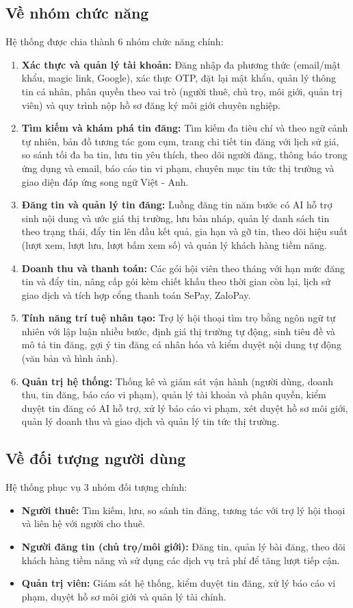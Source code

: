 \subsection{Về nhóm chức năng}
Hệ thống được chia thành 6 nhóm chức năng chính:
\begin{enumerate}
    \item \textbf{Xác thực và quản lý tài khoản:} Đăng nhập đa phương thức (email/mật khẩu, magic link, Google), xác thực OTP, đặt lại mật khẩu, quản lý thông tin cá nhân, phân quyền theo vai trò (người thuê, chủ trọ, môi giới, quản trị viên) và quy trình nộp hồ sơ đăng ký môi giới chuyên nghiệp.
    \item \textbf{Tìm kiếm và khám phá tin đăng:} Tìm kiếm đa tiêu chí và theo ngữ cảnh tự nhiên, bản đồ tương tác gom cụm, trang chi tiết tin đăng với lịch sử giá, so sánh tối đa ba tin, lưu tin yêu thích, theo dõi người đăng, thông báo trong ứng dụng và email, báo cáo tin vi phạm, chuyên mục tin tức thị trường và giao diện đáp ứng song ngữ Việt - Anh.
    \item \textbf{Đăng tin và quản lý tin đăng:} Luồng đăng tin năm bước có AI hỗ trợ sinh nội dung và ước giá thị trường, lưu bản nháp, quản lý danh sách tin theo trạng thái, đẩy tin lên đầu kết quả, gia hạn và gỡ tin, theo dõi hiệu suất (lượt xem, lượt lưu, lượt bấm xem số) và quản lý khách hàng tiềm năng.
    \item \textbf{Doanh thu và thanh toán:} Các gói hội viên theo tháng với hạn mức đăng tin và đẩy tin, nâng cấp gói kèm chiết khấu theo thời gian còn lại, lịch sử giao dịch và tích hợp cổng thanh toán SePay, ZaloPay.
    \item \textbf{Tính năng trí tuệ nhân tạo:} Trợ lý hội thoại tìm trọ bằng ngôn ngữ tự nhiên với lập luận nhiều bước, định giá thị trường tự động, sinh tiêu đề và mô tả tin đăng, gợi ý tin đăng cá nhân hóa và kiểm duyệt nội dung tự động (văn bản và hình ảnh).
    \item \textbf{Quản trị hệ thống:} Thống kê và giám sát vận hành (người dùng, doanh thu, tin đăng, báo cáo vi phạm), quản lý tài khoản và phân quyền, kiểm duyệt tin đăng có AI hỗ trợ, xử lý báo cáo vi phạm, xét duyệt hồ sơ môi giới, quản lý doanh thu và giao dịch và quản lý tin tức thị trường.
\end{enumerate}

\FloatBarrier
\subsection{Về đối tượng người dùng}
Hệ thống phục vụ 3 nhóm đối tượng chính:
\begin{itemize}
    \item \textbf{Người thuê:} Tìm kiếm, lưu, so sánh tin đăng, tương tác với trợ lý hội thoại và liên hệ với người cho thuê.
    \item \textbf{Người đăng tin (chủ trọ/môi giới):} Đăng tin, quản lý bài đăng, theo dõi khách hàng tiềm năng và sử dụng các dịch vụ trả phí để tăng lượt tiếp cận.
    \item \textbf{Quản trị viên:} Giám sát hệ thống, kiểm duyệt tin đăng, xử lý báo cáo vi phạm, duyệt hồ sơ môi giới và quản lý tài chính.
\end{itemize}


